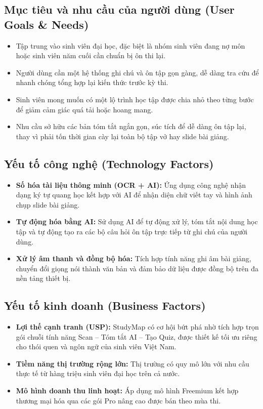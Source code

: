 \documentclass[12pt,a4paper]{report}
\begin{document}
\subsection*{Mục tiêu và nhu cầu của người dùng (User Goals \& Needs)}
\begin{itemize}
  \item Tập trung vào sinh viên đại học, đặc biệt là nhóm sinh viên đang nợ môn hoặc sinh viên năm cuối cần chuẩn bị ôn thi lại.
  \item Người dùng cần một hệ thống ghi chú và ôn tập gọn gàng, dễ dàng tra cứu để nhanh chóng tổng hợp lại kiến thức trước kỳ thi.
  \item Sinh viên mong muốn có một lộ trình học tập được chia nhỏ theo từng bước để giảm cảm giác quá tải hoặc hoang mang.
  \item Nhu cầu sở hữu các bản tóm tắt ngắn gọn, súc tích để dễ dàng ôn tập lại, thay vì phải tốn thời gian cày lại toàn bộ tập vở hay slide bài giảng.
\end{itemize}

\subsection*{Yếu tố công nghệ (Technology Factors)}
\begin{itemize}
  \item \textbf{Số hóa tài liệu thông minh (OCR + AI):} Ứng dụng công nghệ nhận dạng ký tự quang học kết hợp với AI để nhận diện chữ viết tay và hình ảnh chụp slide bài giảng.
  \item \textbf{Tự động hóa bằng AI:} Sử dụng AI để tự động xử lý, tóm tắt nội dung học tập và tự động tạo ra các bộ câu hỏi ôn tập trực tiếp từ ghi chú của người dùng.
  \item \textbf{Xử lý âm thanh và đồng bộ hóa:} Tích hợp tính năng ghi âm bài giảng, chuyển đổi giọng nói thành văn bản và đảm bảo dữ liệu được đồng bộ trên đa nền tảng thiết bị.
\end{itemize}

\subsection*{Yếu tố kinh doanh (Business Factors)}
\begin{itemize}
  \item \textbf{Lợi thế cạnh tranh (USP):} StudyMap có cơ hội bứt phá nhờ tích hợp trọn gói chuỗi tính năng Scan -- Tóm tắt AI -- Tạo Quiz, được thiết kế tối ưu riêng cho thói quen và ngôn ngữ của sinh viên Việt Nam.
  \item \textbf{Tiềm năng thị trường rộng lớn:} Thị trường có quy mô lớn với nhu cầu thực tế từ hàng triệu sinh viên đại học trên cả nước.
  \item \textbf{Mô hình doanh thu linh hoạt:} Áp dụng mô hình Freemium kết hợp thương mại hóa qua các gói Pro nâng cao được bán theo mùa thi.
\end{itemize}
\end{document}
